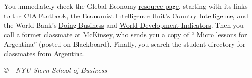 \documentclass[letterpaper,12pt]{article}
\begin{document}
You immediately check the Global Economy 
\href{http://www.stern.nyu.edu/eco/b012303/Backus/ge_resources_db.htm}
{resource page},
starting with its links to the 
\href{http://www.cia.gov/cia/publications/factbook/}{CIA Factbook}, 
the Economist Intelligence Unit's 
\href{http://db.eiu.com/index.asp?layout=AllTitles}{Country Intelligence},
and the World Bank's 
\href{http://www.doingbusiness.org/}
{Doing Business} 
and 
\href{http://devdata.worldbank.org/dataonline/}
{World Development Indicators}.  
Then you call a former classmate at McKinsey,
who sends you a copy of 
``%
{Micro lessons for Argentina}'' (posted on Blackboard).  
Finally, you search the student directory for classmates from Argentina.



\vfill \centerline{\it \copyright \ \number\year \ NYU Stern
School of Business}

\newpage
\end{document}
